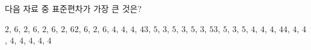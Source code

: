 다음 자료 중 표준편차가 가장 큰 것은?
\begin{choicesv}{$2$, $6$, $2$, $6$, $2$, $6$, $2$, $6$}{$2$, $6$, $2$, $6$, $4$, $4$, $4$, $4$}{$3$, $5$, $3$, $5$, $3$, $5$, $3$, $5$}{$3$, $5$, $3$, $5$, $4$, $4$, $4$, $4$}{$4$, $4$, $4$, $4$, $4$, $4$, $4$, $4$}\end{choicesv}
